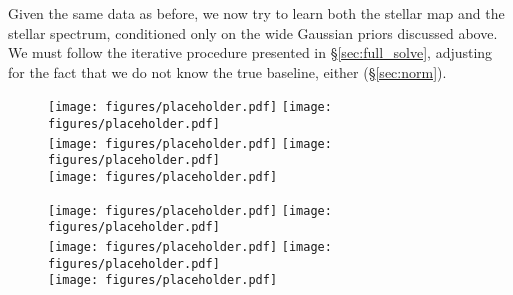 \documentclass[modern]{aastex62}
\begin{document}
Given the same data as before, we now try to learn both the stellar map
and the stellar spectrum, conditioned only on the wide Gaussian priors
discussed above. We must follow the iterative procedure presented in
\S\ref{sec:full_solve}, adjusting for the fact that we do not know
the true baseline, either (\S\ref{sec:norm}).

\begin{figure}[p!]
    \begin{centering}
        \texttt{[image: figures/placeholder.pdf]} %
        \texttt{[image: figures/placeholder.pdf]} %
        \\[0.5em]
        \texttt{[image: figures/placeholder.pdf]} %
        \texttt{[image: figures/placeholder.pdf]} %
        \\[0.5em]
        \texttt{[image: figures/placeholder.pdf]} %
    \end{centering}
\end{figure}

\begin{figure}[p!]
    \begin{centering}
        \texttt{[image: figures/placeholder.pdf]} %
        \texttt{[image: figures/placeholder.pdf]} %
        \\[0.5em]
        \texttt{[image: figures/placeholder.pdf]} %
        \texttt{[image: figures/placeholder.pdf]} %
        \\[0.5em]
        \texttt{[image: figures/placeholder.pdf]} %
    \end{centering}
\end{figure}
\end{document}
